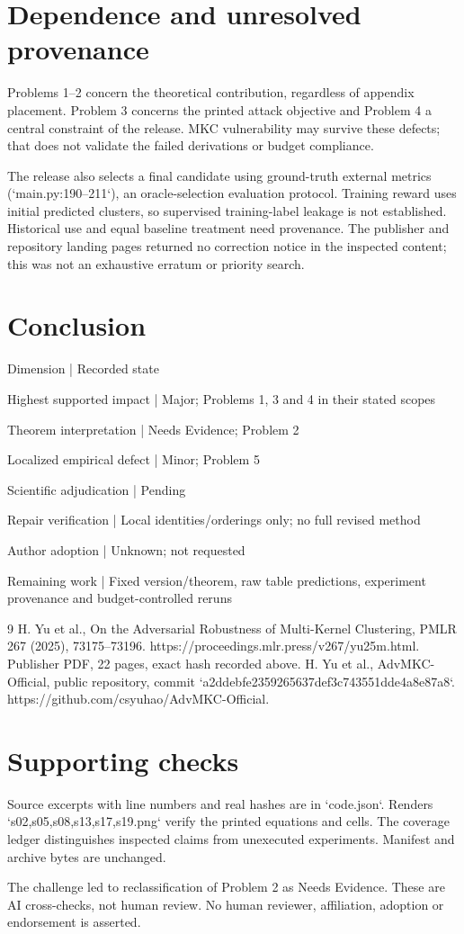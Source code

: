 \documentclass[10pt]{article}
\begin{document}
\section*{Dependence and unresolved provenance}
Problems 1–2 concern the theoretical contribution, regardless of appendix placement. Problem 3 concerns the printed attack objective and Problem 4 a central constraint of the release. MKC vulnerability may survive these defects; that does not validate the failed derivations or budget compliance.\par
The release also selects a final candidate using ground-truth external metrics (`main.py:190–211`), an oracle-selection evaluation protocol. Training reward uses initial predicted clusters, so supervised training-label leakage is not established. Historical use and equal baseline treatment need provenance. The publisher and repository landing pages returned no correction notice in the inspected content; this was not an exhaustive erratum or priority search.\par
\section*{Conclusion}
Dimension | Recorded state\par
Highest supported impact | Major; Problems 1, 3 and 4 in their stated scopes\par
Theorem interpretation | Needs Evidence; Problem 2\par
Localized empirical defect | Minor; Problem 5\par
Scientific adjudication | Pending\par
Repair verification | Local identities/orderings only; no full revised method\par
Author adoption | Unknown; not requested\par
Remaining work | Fixed version/theorem, raw table predictions, experiment provenance and budget-controlled reruns\par
9 H. Yu et al., On the Adversarial Robustness of Multi-Kernel Clustering, PMLR 267 (2025), 73175–73196. https://proceedings.mlr.press/v267/yu25m.html. Publisher PDF, 22 pages, exact hash recorded above. H. Yu et al., AdvMKC-Official, public repository, commit `a2ddebfe2359265637def3c743551dde4a8e87a8`. https://github.com/csyuhao/AdvMKC-Official.\par
\section*{Supporting checks}
Source excerpts with line numbers and real hashes are in `code.json`. Renders `s02,s05,s08,s13,s17,s19.png` verify the printed equations and cells. The coverage ledger distinguishes inspected claims from unexecuted experiments. Manifest and archive bytes are unchanged.\par
The challenge led to reclassification of Problem 2 as Needs Evidence. These are AI cross-checks, not human review. No human reviewer, affiliation, adoption or endorsement is asserted.\par
\end{document}
